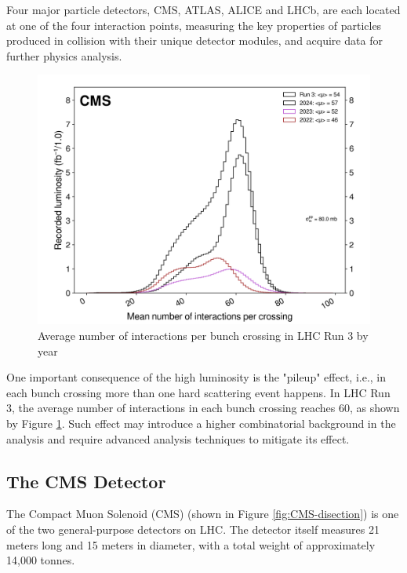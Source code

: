 \documentclass[10pt,twocolumn]{article}
\begin{document}
Four major particle detectors, CMS, ATLAS, ALICE and LHCb, are each located at one of the four interaction points, measuring the key properties of particles produced in collision with their unique detector modules, and acquire data for further physics analysis.

\begin{figure}
    \centering
    \includegraphics[width=1.0\linewidth]{images/CMS_pileup_allYears_run3.png}
    \caption{Average number of interactions per bunch crossing in LHC Run 3 by year\cite{CMS:LUMI-PUB}}
    \label{fig:CMS_pileup}
\end{figure}

One important consequence of the high luminosity is the "pileup" effect, i.e., in each bunch crossing more than one hard scattering event happens. In LHC Run 3, the average number of interactions in each bunch crossing reaches 60, as shown by Figure \ref{fig:CMS_pileup}. \cite{CMS:LUMI-PUB} Such effect may introduce a higher combinatorial background in the analysis and require advanced analysis techniques to mitigate its effect.

\subsection{The CMS Detector}

The Compact Muon Solenoid (CMS) (shown in Figure \ref{fig:CMS-disection}) is one of the two general-purpose detectors on LHC. The detector itself measures 21 meters long and 15 meters in diameter, with a total weight of approximately 14,000 tonnes.
\end{document}
